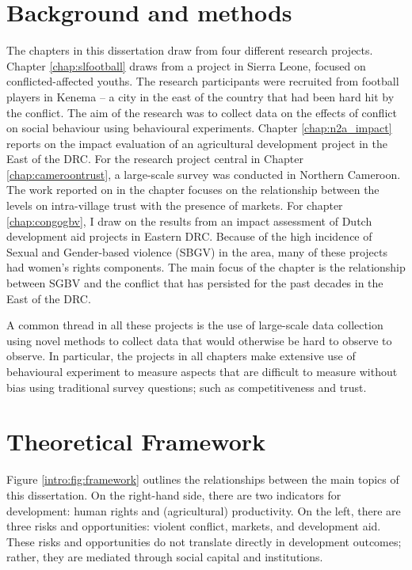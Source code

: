 \section{Background and methods}
The chapters in this dissertation draw from four different research projects. Chapter \ref{chap:slfootball} draws from a project in Sierra Leone, focused on conflicted-affected youths. The research participants were recruited from football players in Kenema -- a city in the east of the country that had been hard hit by the conflict. The aim of the research was to collect data on the effects of conflict on social behaviour using behavioural experiments. Chapter \ref{chap:n2a_impact} reports on the impact evaluation of an agricultural development project in the East of the DRC. 
For the research project central in Chapter \ref{chap:cameroontrust}, a large-scale survey was conducted in Northern Cameroon. The work reported on in the chapter focuses on the relationship between the levels on intra-village trust with the presence of markets. For chapter \ref{chap:congogbv}, I draw on the results from an impact assessment of Dutch development aid projects in Eastern DRC. Because of the high incidence of Sexual and Gender-based violence (SBGV) in the area, many of these projects had women's rights components. The main focus of the chapter is the relationship between SGBV and the conflict that has persisted for the past decades in the East of the DRC. 

A common thread in all these projects is the use of large-scale data collection using novel methods to collect data that would otherwise be hard to observe to observe. In particular, the projects in all chapters make extensive use of behavioural experiment to measure aspects that are difficult to measure without bias using traditional survey questions; such as competitiveness and trust. 

\section{Theoretical Framework}
Figure \ref{intro:fig:framework} outlines the relationships between the main topics of this dissertation. On the right-hand side, there are two indicators for development: human rights and (agricultural) productivity. On the left, there are three risks and opportunities: violent conflict, markets, and development aid. These risks and opportunities do not translate directly in development outcomes; rather, they are mediated through social capital and institutions.

